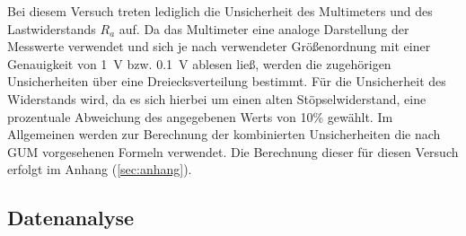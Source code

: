 Bei diesem Versuch treten lediglich die Unsicherheit des Multimeters und des Lastwiderstands $R_a$ auf. 
Da das Multimeter eine analoge Darstellung der Messwerte verwendet und sich je nach verwendeter Größenordnung mit einer Genauigkeit von \SI{1}{V} bzw. \SI{0,1}{V} ablesen ließ, werden die zugehörigen Unsicherheiten über eine Dreiecksverteilung bestimmt.
Für die Unsicherheit des Widerstands wird, da es sich hierbei um einen alten Stöpselwiderstand, eine prozentuale Abweichung des angegebenen Werts von 10\% gewählt.
Im Allgemeinen werden zur Berechnung der kombinierten Unsicherheiten die nach GUM vorgesehenen Formeln verwendet. 
Die Berechnung dieser für diesen Versuch erfolgt im Anhang (\ref*{sec:anhang}).

\subsection{Datenanalyse}

